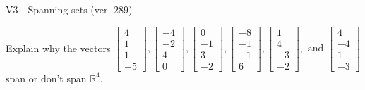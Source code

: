 \begin{exercise}
  \begin{exerciseTitle}V3 - Spanning sets (ver. 289)\end{exerciseTitle}
  \begin{exerciseStatement}
    Explain why the vectors \(\left[\begin{array}{r}
4 \\
1 \\
1 \\
-5
\end{array}\right] , \left[\begin{array}{r}
-4 \\
-2 \\
4 \\
0
\end{array}\right] , \left[\begin{array}{r}
0 \\
-1 \\
3 \\
-2
\end{array}\right] , \left[\begin{array}{r}
-8 \\
-1 \\
-1 \\
6
\end{array}\right] , \left[\begin{array}{r}
1 \\
4 \\
-3 \\
-2
\end{array}\right] , \text{ and } \left[\begin{array}{r}
4 \\
-4 \\
1 \\
-3
\end{array}\right]\) span or don't span \(\mathbb{R}^4\). 
	



\end{exerciseStatement}
\end{exercise}
